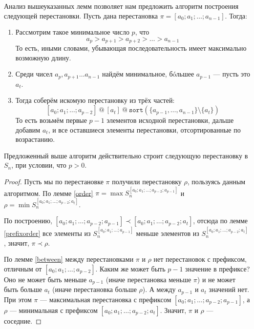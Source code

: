 \documentclass[12pt,a4paper,oneside]{article}
\begin{document}
Анализ вышеуказанных лемм позволяет нам предложить алгоритм построения следующей
перестановки. Пусть дана перестановка $\pi = [a_0; a_1; \dots; a_{n-1}]$. Тогда:
\begin{enumerate}
\item Рассмотрим такое минимальное число $p$, что 
$$a_p > a_{p+1} > a_{p+2} > \dots > a_{n-1}$$
То есть, иными словами, убывающая последовательность имеет максимально возможную
длину. 
\item Среди чисел $a_p, a_{p+1} \dots a_{n-1}$ найдём минимальное, б\'{o}льшее $a_{p-1}$ --- 
пусть это $a_t$.
\item Тогда соберём искомую перестановку из трёх частей:
  $$[a_0; a_1; \dots; a_{p-2}] \ @ \ [a_t] \ @ \ \texttt{sort} (\{a_{p-1},\dots,a_{n-1}\} \setminus \{a_t\})$$
То есть возьмём первые $p-1$ элементов исходной перестановки, дальше добавим $a_t$,
и все оставшиеся элементы перестановки, отсортированные по возрастанию.
\end{enumerate}

\begin{theorem} Предложенный выше алгоритм действительно строит следующую перестановку
в $S_n$, при условии, что $p > 0$.
\end{theorem}
\begin{proof}
Пусть мы по перестановке $\pi$ получили перестановку $\rho$, пользуясь данным алгоритмом.
По лемме \ref{order} $\pi = \max S^{[a_0;a_1;\dots;a_{p-2};a_{p-1}]}_n$
и $\rho = \min S^{[a_0;a_1;\dots;a_{p-2};a_t]}_n$.

По построению, $[a_0;a_1;\dots;a_{p-2};a_{p-1}] \prec [a_0;a_1;\dots;a_{p-2};a_t]$, отсюда
по лемме \ref{prefixorder} все элементы из $S^{[a_0;a_1;\dots;a_{p-1}]}_n$ меньше 
элементов из $S^{[a_0;a_1;\dots;a_{p-2};a_t]}_n$, значит, $\pi \prec \rho$.

По лемме \ref{between} между перестановками $\pi$ и $\rho$ нет перестановок с префиксом,
отличным от $[a_0;a_1;\dots;a_{p-2}]$. Каким же может быть $p-1$ значение в префиксе?
Оно не может быть меньше $a_{p-1}$ (иначе перестановка меньше $\pi$) и не может быть
больше $a_t$ (иначе перестановка больше $\rho$). А между $a_{p-1}$ и $a_t$ значений
нет. При этом $\pi$ --- максимальная перестановка с префиксом $[a_0;a_1;\dots;a_{p-2};a_{p-1}]$,
а $\rho$ --- минимальная с префиксом $[a_0;a_1;\dots;a_{p-2};a_t]$.
Значит, $\pi$ и $\rho$ --- соседние.
\end{proof}
\end{document}
